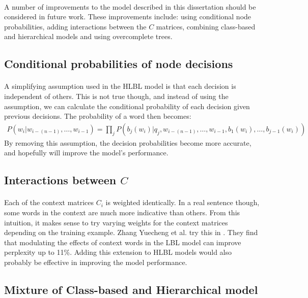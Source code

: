 \paragraph{}
A number of improvements to the model described in this dissertation should be considered in future work.
These improvements include: using conditional node probabilities, adding interactions between the $C$ matrices, combining class-based and hierarchical models and using overcomplete trees.
 
\subsection{Conditional probabilities of node decisions}
\paragraph{}
A simplifying assumption used in the HLBL model is that each decision is independent of others. This is not true though, and instead of using the assumption, we can calculate the conditional probability of each decision given previous decisions. The probability of a word then becomes:
\begin{align}
P(w_i | w_{i-(n-1)},\dots, w_{i-1})  = \prod_j P(b_j(w_i) | q_j, w_{i-(n-1)},\dots, w_{i-1}, b_1(w_i), \dots, b_{j-1}(w_i))
\end{align}
By removing this assumption, the decision probabilities become more accurate, and hopefully will improve the model's performance.

\subsection{Interactions between $C$}
\paragraph{}
Each of the context matrices $C_i$ is weighted identically. In a real sentence though, some words in the context are much more indicative than others. From this intuition, it makes sense to try varying weights for the context matrices depending on the training example. Zhang Yuecheng et al. try this in \cite{Yuecheng2008}. They find that modulating the effects of context words in the LBL model can improve perplexity up to 11\%. Adding this extension to HLBL models would also probably be effective in improving the model performance.

\subsection{Mixture of Class-based and Hierarchical model}

